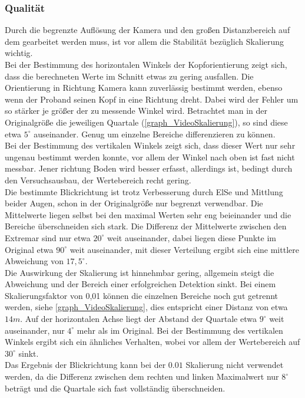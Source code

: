 \subsubsection{Qualität}
Durch die begrenzte Auflösung der Kamera und den großen Distanzbereich auf dem gearbeitet werden muss, ist vor allem die Stabilität bezüglich Skalierung wichtig.\\
Bei der Bestimmung des horizontalen Winkels der Kopforientierung zeigt sich, dass die berechneten Werte im Schnitt etwas zu gering ausfallen. Die Orientierung in Richtung Kamera kann zuverlässig bestimmt werden, ebenso wenn der Proband seinen Kopf in eine Richtung dreht. Dabei wird der Fehler um so stärker je größer der zu messende Winkel wird. Betrachtet man in der Originalgröße die jeweiligen Quartale (\autoref{graph_VideoSkalierung}), so sind diese etwa $5^\circ$ auseinander. Genug um einzelne Bereiche differenzieren zu können.\\
Bei der Bestimmung des vertikalen Winkels zeigt sich, dass dieser Wert nur sehr ungenau bestimmt werden konnte, vor allem der Winkel nach oben ist fast nicht messbar. Jener richtung Boden wird besser erfasst, allerdings ist, bedingt durch den Versuchsausbau, der Wertebereich recht gering.\\
Die bestimmte Blickrichtung ist trotz Verbesserung durch ElSe und Mittlung beider Augen, schon in der Originalgröße nur begrenzt verwendbar. Die Mittelwerte liegen selbst bei den maximal Werten sehr eng beieinander und die Bereiche überschneiden sich stark. Die Differenz der Mittelwerte zwischen den Extremar sind nur etwa $20^\circ$ weit auseinander, dabei liegen diese Punkte im Original etwa $90^\circ$ weit auseinander, mit dieser Verteilung ergibt sich eine mittlere Abweichung von $17,5^\circ$. \\
Die Auswirkung der Skalierung ist hinnehmbar gering, allgemein steigt die Abweichung und der Bereich einer erfolgreichen Detektion sinkt. Bei einem Skalierungsfaktor von 0,01 können die einzelnen Bereiche noch gut getrennt werden, siehe \autoref{graph_VideoSkalierung}, dies entspricht einer Distanz von etwa $14m$. Auf der horizontalen Achse liegt der Abstand der Quartale etwa $9^\circ$ weit auseinander, nur $4^\circ$ mehr als im Original. Bei der Bestimmung des vertikalen Winkels ergibt sich ein ähnliches Verhalten, wobei vor allem der Wertebereich auf $30^\circ$ sinkt.\\
Das Ergebnis der Blickrichtung kann bei der $0.01$ Skalierung nicht verwendet werden, da die Differenz zwischen dem rechten und linken Maximalwert nur $8^\circ$ beträgt und die Quartale sich fast vollständig überschneiden.\\
